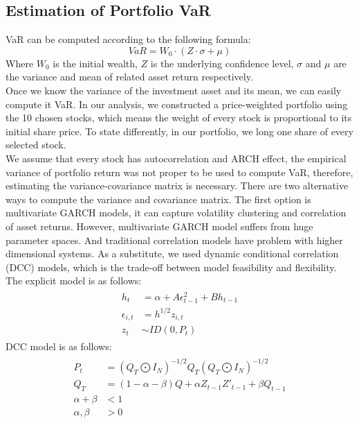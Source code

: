     \subsection{Estimation of Portfolio VaR}
    \noindent VaR can be computed according to the following formula:\\
    \begin{equation}\label{}
    VaR=W_{0}\cdot(Z\cdot\sigma+\mu)
    \end{equation}
    Where $W_{0}$ is the initial wealth, $Z$ is the underlying confidence level, $\sigma$ and $\mu$ are the variance and mean of related asset return respectively.\\
    [\baselineskip] \indent Once we know the variance of the investment asset and its mean, we can easily compute it VaR. In our analysis, we constructed a price-weighted portfolio using the 10 chosen stocks, which means the weight of every stock is proportional to its initial share price. To state differently, in our portfolio, we long one share of every selected stock.\\
    [\baselineskip] \indent We assume that every stock has autocorrelation and ARCH effect, the empirical variance of portfolio return was not proper to be used to compute VaR, therefore, estimating the variance-covariance matrix is necessary. There are two alternative ways to compute the variance and covariance matrix. The first option is multivariate GARCH models, it can capture volatility clustering and correlation of asset returns. However, multivariate GARCH model suffers from huge parameter spaces. And traditional correlation models have problem with higher dimensional systems. As a substitute, we used dynamic conditional correlation (DCC) models, which is the trade-off between model feasibility and flexibility. The explicit model is as follows:\\
    \begin{eqnarray}\label{}
    \begin{split}
    h_{t}&=\alpha+A\epsilon^{2}_{t-1}+Bh_{t-1}\\
    \epsilon_{i,t}&=h^{1/2}z_{i,t}\\
    z_{t}&\sim ID(0,P_{t})
    \end{split}
    \end{eqnarray}
    DCC model \citep{engle2002dynamic} is as follows:\\
    \begin{eqnarray}\label{}
    \begin{split}
    P_{t}&=(Q_{T}\bigodot I_{N})^{-1/2}Q_{T}(Q_{T}\bigodot I_{N})^{-1/2}\\
    Q_{T}&=(1-\alpha-\beta)Q+\alpha Z_{t-1}Z'_{t-1}+\beta Q_{t-1}\\
    \alpha+\beta &<1\\
    \alpha ,\beta &>0
    \end{split}
    \end{eqnarray}
